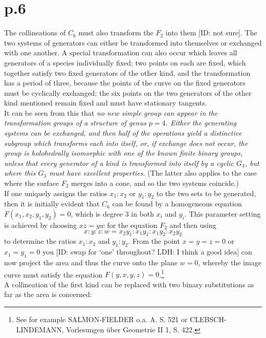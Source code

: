 \documentclass[leqno]{article}
\begin{document}
\section{p.6}
The collineations of $ C_6 $ must also transform the $ F_2 $ into them [ID: not sure]. The two systems of generators can either be transformed into themselves or exchanged with one another. A special transformation can also occur which leaves all generators of a species individually fixed; two points on each are fixed, which together satisfy two fixed generators of the other kind, and the transformation has a period of three, because the points of the curve on the fixed generators must be cyclically exchanged; the six points on the two generators of the other kind mentioned remain fixed and must have stationary tangents. \\
It can be seen from this that \textit{no new simple group can appear in the transformation groups of a structure of genus $ p = 4 $. Either the generating systems can be exchanged, and then half of the operations yield a distinctive subgroup which transforms each into itself, or, if exchange does not occur, the group is holohedrally isomorphic with one of the known finite binary groups, unless that every generator of a kind is transformed into itself by a cyclic $ G_3 $, but where this $ G_3 $ must have excellent properties.} (The latter also applies to the case where the surface $ F_2 $ merges into a cone, and so the two systems coincide.) \\
If one uniquely assigns the ratios $ x_1: x_2 $ or $ y_1: y_2 $ to the two sets to be generated, then it is initially evident that $ C_6 $ can be found by a homogeneous equation $ F (x_1, x_2, y_1, y_2) = 0 $, which is degree 3 in both $ x_i $ and $ y_i $. This parameter setting is achieved by choosing $ xz = yw $ for the equation $F_2$  and then using
\begin{equation}\label{eq: 2.1}
x: y : z : w = x_2y_1 :x_1 y_1 : x_1 y_2: x_2 y_2 \tag{1}
\end{equation}
to determine the ratios $ x_1: x_2 $ and $ y_1: y_2 $. From the point $ x = y = z = 0 $ or $ x_1 = y_1 = 0 $ you [ID: swap for `one' throughout? LDH: I think a good idea] can now project the area and thus the curve onto the plane $ w = 0 $, whereby the image curve must satisfy the equation $F(y, x, y, z) = 0$.\footnote{See for example SALMON-FIELDER o.a. A. S. 521 or CLEBSCH-LINDEMANN, Vorlesungen \"uber Geometrie II 1, S. 422.} \\
A collineation of the first kind can be replaced with two binary substitutions as far as the area is concerned:
\end{document}
